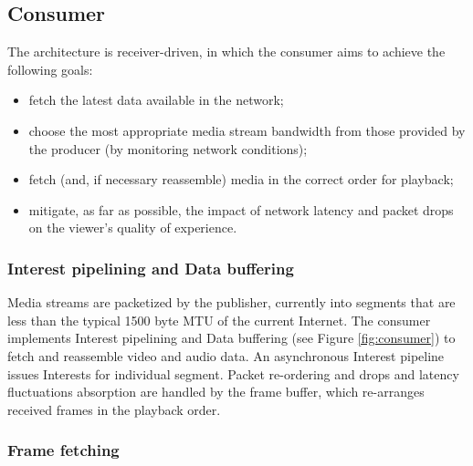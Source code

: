 

\subsection{Consumer}

The \ndnrtcName{} architecture is receiver-driven, in which the consumer aims to achieve the following goals:
\begin{itemize}
\item fetch the latest data available in the network; 
\item choose the most appropriate media stream bandwidth from those  provided by the producer (by monitoring network conditions);
\item fetch (and, if necessary reassemble) media in the correct order for playback;
\item mitigate, as far as possible, the impact of network latency and packet drops on the viewer's quality of experience.
\end{itemize}

\subsubsection{Interest pipelining and Data buffering}

Media streams are packetized by the publisher, currently into segments that are less than the typical 1500 byte MTU of the current Internet. The consumer implements Interest pipelining and Data buffering (see Figure \ref{fig:consumer}) to fetch and reassemble video and audio data. An asynchronous Interest pipeline issues Interests for individual segment. Packet re-ordering and drops and latency fluctuations absorption are handled by the frame buffer, which re-arranges received frames in the playback order.


\subsubsection{Frame fetching}

